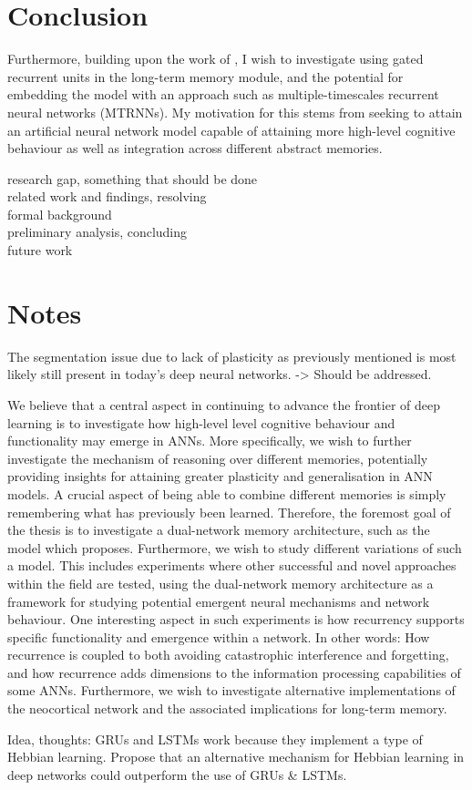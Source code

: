 \section{Conclusion}

Furthermore, building upon the work of \cite{Hattori2014}, I wish to investigate using gated recurrent units \citep{Cho2014} in the long-term memory module, and the potential for embedding the model with an approach such as multiple-timescales recurrent neural networks (MTRNNs). My motivation for this stems from seeking to attain an artificial neural network model capable of attaining more high-level cognitive behaviour as well as integration across different abstract memories.

research gap, something that should be done
\\
related work and findings, resolving
\\
formal background
\\
preliminary analysis, concluding
\\
future work


\section{Notes}

The segmentation issue due to lack of plasticity as previously mentioned is most likely still present in today's deep neural networks. -> Should be addressed.



We believe that a central aspect in continuing to advance the frontier of deep learning is to investigate how high-level level cognitive behaviour and functionality may emerge in ANNs. More specifically, we wish to further investigate the mechanism of reasoning over different memories, potentially providing insights for attaining greater plasticity and generalisation in ANN models. A crucial aspect of being able to combine different memories is simply remembering what has previously been learned. Therefore, the foremost goal of the thesis is to investigate a dual-network memory architecture, such as the model which \cite{Hattori2014} proposes. 
Furthermore, we wish to study different variations of such a model. This includes experiments where other successful and novel approaches within the field are tested, using the dual-network memory architecture as a framework for studying potential emergent neural mechanisms and network behaviour.
One interesting aspect in such experiments is how recurrency supports specific functionality and emergence within a network. In other words: How recurrence is coupled to both avoiding catastrophic interference and forgetting, and how recurrence adds dimensions to the information processing capabilities of some ANNs. Furthermore, we wish to investigate alternative implementations of the neocortical network and the associated implications for long-term memory.

Idea, thoughts: GRUs and LSTMs work because they implement a type of Hebbian learning. 
Propose that an alternative mechanism for Hebbian learning in deep networks could outperform the use of GRUs \& LSTMs.

\cleardoublepage